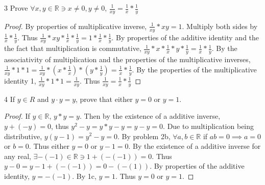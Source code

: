 \documentclass{article}
\newcommand{\R}{\mathbb{R}}
\begin{document}
\begin{PROB}{3}\label{Problem 3.}
    Prove $\forall x, y \in \R \ni x \neq 0, y \neq 0$, $\frac{1}{xy} = \frac{1}{x} * \frac{1}{y}$  
\end{PROB}
\begin{proof}
    By properties of multiplicative inverse, $\frac{1}{xy} * xy = 1$. Multiply both sides by $\frac{1}{x}*\frac{1}{y}$. Thus $\frac{1}{xy} * xy *\frac{1}{x} * \frac{1}{y} = 1 * \frac{1}{x} * \frac{1}{y}$. By properties of the additive identity and the the fact that multiplication is commutative, $\frac{1}{xy} * x * \frac{1}{x} * y * \frac{1}{y} = \frac{1}{x} * \frac{1}{y}$. By the associativity of multiplication and the properties of the multiplicative inverses, $\frac{1}{xy} * 1 * 1 = \frac{1}{xy} * (x * \frac{1}{x}) * (y * \frac{1}{y}) = \frac{1}{x} * \frac{1}{y}$. By the properties of the multiplicative identity 1, $\frac{1}{xy} * 1 * 1 = \frac{1}{xy}$. Thus $\frac{1}{xy} = \frac{1}{x} * \frac{1}{y}$       
\end{proof}

\bigskip

\begin{PROB}{4}\label{Problem 4.}
    If $y \in R$ and $y · y = y$, prove that either $y = 0$ or $y = 1$.
\end{PROB}
\begin{proof}
    If $y \in \R$, $y * y = y$. Then by the existence of a additive inverse, $y + (-y) = 0$, thus $y^2 - y = y * y - y = y - y = 0$. Due to multiplication being distributive, $y(y - 1) = y^2 - y = 0$. By problem 2b, $\forall a, b \in \R$ if $ab = 0 \implies a = 0$ or $b = 0$. Thus either $y = 0$ or $y - 1 = 0$. By the existence of a additive inverse for any real, $\exists -(-1) \in \R \ni 1 + (-(-1)) = 0$. Thus $y - 0 = y - 1 + (-(-1)) = 0 - (-(1))$. By properties of the additive identity, $y = -(-1)$. By 1c, $y = 1$. Thus $y =0$ or $y =1$.                   
\end{proof}

\bigskip
\end{document}
